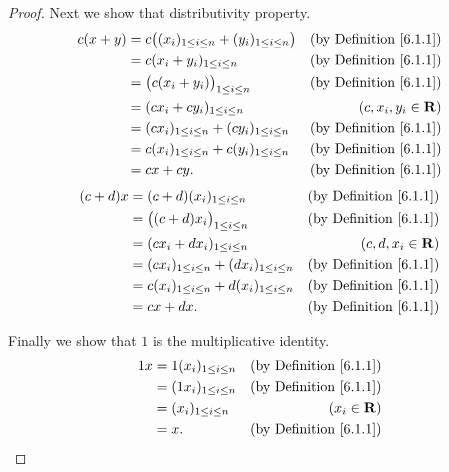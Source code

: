 \begin{proof}
    Next we show that distributivity property.
    \begin{align*}
        c(x + y) & = c\big((x_i)_{1 \leq i \leq n} + (y_i)_{1 \leq i \leq n}\big) & \text{(by Definition \ref{6.1.1})} \\
                 & = c(x_i + y_i)_{1 \leq i \leq n}                               & \text{(by Definition \ref{6.1.1})} \\
                 & = \big(c(x_i + y_i)\big)_{1 \leq i \leq n}                     & \text{(by Definition \ref{6.1.1})} \\
                 & = (c x_i + c y_i)_{1 \leq i \leq n}                            & (c, x_i, y_i \in \mathbf{R})       \\
                 & = (c x_i)_{1 \leq i \leq n} + (c y_i)_{1 \leq i \leq n}        & \text{(by Definition \ref{6.1.1})} \\
                 & = c(x_i)_{1 \leq i \leq n} + c(y_i)_{1 \leq i \leq n}          & \text{(by Definition \ref{6.1.1})} \\
                 & = cx + cy.                                                     & \text{(by Definition \ref{6.1.1})}
    \end{align*}
    \begin{align*}
        (c + d)x & = (c + d)(x_i)_{1 \leq i \leq n}                        & \text{(by Definition \ref{6.1.1})} \\
                 & = \big((c + d) x_i\big)_{1 \leq i \leq n}               & \text{(by Definition \ref{6.1.1})} \\
                 & = (c x_i + d x_i)_{1 \leq i \leq n}                     & (c, d, x_i \in \mathbf{R})         \\
                 & = (c x_i)_{1 \leq i \leq n} + (d x_i)_{1 \leq i \leq n} & \text{(by Definition \ref{6.1.1})} \\
                 & = c(x_i)_{1 \leq i \leq n} + d(x_i)_{1 \leq i \leq n}   & \text{(by Definition \ref{6.1.1})} \\
                 & = cx + dx.                                              & \text{(by Definition \ref{6.1.1})}
    \end{align*}

    Finally we show that \(1\) is the multiplicative identity.
    \begin{align*}
        1 x & = 1 (x_i)_{1 \leq i \leq n} & \text{(by Definition \ref{6.1.1})} \\
            & = (1 x_i)_{1 \leq i \leq n} & \text{(by Definition \ref{6.1.1})} \\
            & = (x_i)_{1 \leq i \leq n}   & (x_i \in \mathbf{R})               \\
            & = x.                        & \text{(by Definition \ref{6.1.1})}
    \end{align*}
\end{proof}

